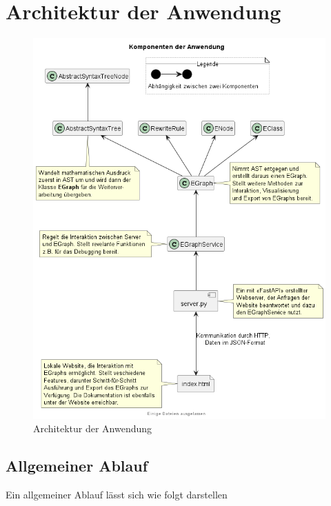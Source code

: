 \section{Architektur der Anwendung}\label{sec:architektur}

\begin{figure}[H]
  \includegraphics[width=\textwidth]{../fig/components.png}
  \caption{Architektur der Anwendung}
  \label{fig:architektur}
\end{figure}


\subsection{Allgemeiner Ablauf}

Ein allgemeiner Ablauf lässt sich wie folgt darstellen

